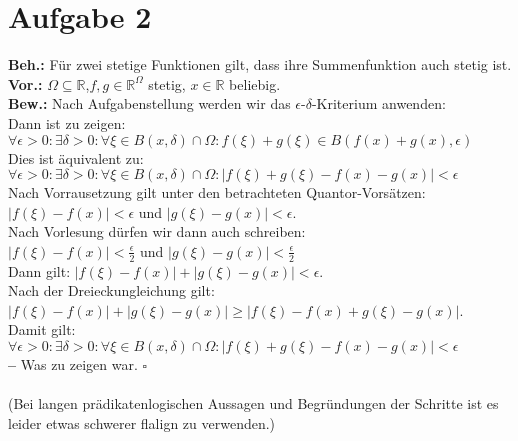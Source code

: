 \documentclass[12pt, a4paper]{article}
\newcommand*{\qed}{\null\nobreak\hfill\ensuremath{\square}}
\newcommand*{\puffer}{\text{ }\text{ }\text{ }\text{ }}
\newcommand*{\gedanke}{\textbf{-- }}
\begin{document}
\section*{Aufgabe 2}
\textbf{Beh.:} Für zwei stetige Funktionen gilt, dass ihre Summenfunktion auch stetig ist. \\
\textbf{Vor.:} \(\Omega \subseteq \mathbb{R}\),\puffer\(f,g \in \mathbb{R}^\Omega\) stetig, \puffer \(x \in \mathbb{R}\) beliebig. \\
\textbf{Bew.:} Nach Aufgabenstellung werden wir das \(\epsilon\)-\(\delta\)-Kriterium anwenden:\\
Dann ist zu zeigen: \\
\(\forall \epsilon > 0: \exists \delta > 0: \forall \xi \in B(x, \delta) \cap \Omega: f(\xi) + g(\xi) \in B(f(x) + g(x), \epsilon)\) \\
Dies ist äquivalent zu:\\
\(\forall \epsilon > 0: \exists \delta > 0: \forall \xi \in B(x, \delta) \cap \Omega: |f(\xi) + g(\xi) - f(x) - g(x)|  < \epsilon\) \\
Nach Vorrausetzung gilt unter den betrachteten Quantor-Vorsätzen: \\
\(|f(\xi) - f(x)| < \epsilon\) und \(|g(\xi) - g(x)| < \epsilon\). \\
Nach Vorlesung dürfen wir dann auch schreiben: \\
\(|f(\xi) - f(x)| < \frac\epsilon 2\) und \(|g(\xi) - g(x)| < \frac\epsilon 2\) \\
Dann gilt: \(|f(\xi) - f(x)| + |g(\xi) - g(x)| < \epsilon\). \\
Nach der Dreieckungleichung gilt:\\
\(|f(\xi) - f(x)| + |g(\xi) - g(x)| \ge |f(\xi) - f(x) + g(\xi) - g(x)|\). \\
Damit gilt: \(\forall \epsilon > 0: \exists \delta > 0: \forall \xi \in B(x, \delta) \cap \Omega: |f(\xi) + g(\xi) - f(x) - g(x)|  < \epsilon\) \\
\gedanke Was zu zeigen war. \qed \\
\\
(Bei langen prädikatenlogischen Aussagen und Begründungen der Schritte ist es leider etwas schwerer flalign zu verwenden.)
\end{document}
